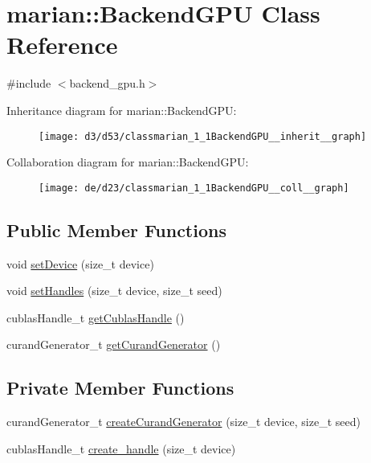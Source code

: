 \hypertarget{classmarian_1_1BackendGPU}{}\section{marian\+:\+:Backend\+G\+PU Class Reference}
\label{classmarian_1_1BackendGPU}


{\ttfamily \#include $<$backend\+\_\+gpu.\+h$>$}



Inheritance diagram for marian\+:\+:Backend\+G\+PU\+:
\nopagebreak
\begin{figure}[H]
\begin{center}
\leavevmode
\texttt{[image: d3/d53/classmarian\_1\_1BackendGPU\_\_inherit\_\_graph]}
\end{center}
\end{figure}


Collaboration diagram for marian\+:\+:Backend\+G\+PU\+:
\nopagebreak
\begin{figure}[H]
\begin{center}
\leavevmode
\texttt{[image: de/d23/classmarian\_1\_1BackendGPU\_\_coll\_\_graph]}
\end{center}
\end{figure}
\subsection*{Public Member Functions}
\begin{DoxyCompactItemize}
\item 
void \hyperlink{classmarian_1_1BackendGPU_adf0609049c6b7cea424fee23f789bc52}{set\+Device} (size\+\_\+t device)
\item 
void \hyperlink{classmarian_1_1BackendGPU_a2cdac5f8db383a13f1dadd92739362d9}{set\+Handles} (size\+\_\+t device, size\+\_\+t seed)
\item 
cublas\+Handle\+\_\+t \hyperlink{classmarian_1_1BackendGPU_a49fb5580e176ef2e794772d1904458f9}{get\+Cublas\+Handle} ()
\item 
curand\+Generator\+\_\+t \hyperlink{classmarian_1_1BackendGPU_a0070cdc52a18b15942a911a2f774bd04}{get\+Curand\+Generator} ()
\end{DoxyCompactItemize}
\subsection*{Private Member Functions}
\begin{DoxyCompactItemize}
\item 
curand\+Generator\+\_\+t \hyperlink{classmarian_1_1BackendGPU_a47ba8ab67609328e2ac7239f96776c52}{create\+Curand\+Generator} (size\+\_\+t device, size\+\_\+t seed)
\item 
cublas\+Handle\+\_\+t \hyperlink{classmarian_1_1BackendGPU_a48b75aa1fb526adafaaad99281518d08}{create\+\_\+handle} (size\+\_\+t device)
\end{DoxyCompactItemize}
